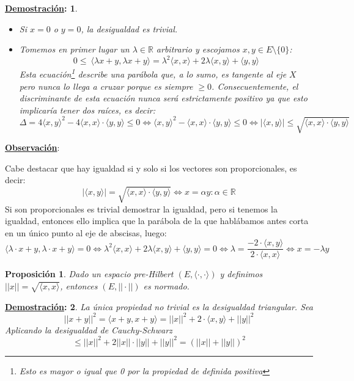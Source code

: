 \documentclass[10pt,a4paper,openright]{book}
\theoremstyle{break}
\newtheorem*{prop}{Proposición}
\newtheorem*{demo}{\underline{Demostración}:}
\begin{document}
\begin{demo}
\begin{itemize}
\item Si $x = 0$ o $y=0$, la desigualdad es trivial.

\item Tomemos en primer lugar un $\lambda\in \mathbb R$ arbitrario y escojamos $x,y \in E \setminus \{0\}$:
$$0 \leq \ \langle \lambda x + y, \lambda x + y\rangle = \lambda^2 \langle x,x\rangle + 2\lambda \langle x,y\rangle + \langle y,y\rangle$$
Esta ecuación\footnote{Esto es mayor o igual que 0 por la propiedad de definida positiva} describe una parábola que, a lo sumo, es tangente al eje $X$ pero nunca lo llega a cruzar porque es siempre $\geq 0$. Consecuentemente, el discriminante de esta ecuación nunca será estrictamente positivo ya que esto implicaría tener dos raíces, es decir:
$$\Delta = 4 \langle x,y\rangle^2 - 4\langle x,x\rangle\cdot \langle y,y\rangle \leq 0 \Leftrightarrow \langle x,y\rangle^2 -\langle x,x\rangle\cdot \langle y,y\rangle \leq 0 \Leftrightarrow|\langle x,y\rangle| \leq \sqrt{\langle x,x\rangle\cdot\langle y,y\rangle}$$
\end{itemize}
\end{demo}

\underline{\textbf{Observación}}:

Cabe destacar que hay igualdad si y solo si los vectores son proporcionales, es decir:
$$|\langle x,y\rangle| =\sqrt{\langle x,x\rangle \cdot \langle y,y\rangle} \Leftrightarrow x = \alpha y : \alpha \in \mathbb{R}$$
Si son proporcionales es trivial demostrar la igualdad, pero si tenemos la igualdad, entonces ello implica que la parábola de la que hablábamos antes corta en un único punto al eje de abscisas, luego:
$$\langle\lambda \cdot x + y, \lambda \cdot x + y\rangle =  0\Leftrightarrow  \lambda^2 \langle x,x\rangle + 2\lambda \langle x,y\rangle + \langle y,y\rangle = 0 \Leftrightarrow \lambda = \frac{-2 \cdot \langle x,y\rangle}{2 \cdot \langle x,x\rangle} \Leftrightarrow x = -\lambda y$$

\begin{prop}
Dado un espacio pre-Hilbert $(E, \langle \cdot, \cdot \rangle)$ y definimos $||x|| = \sqrt{\langle x,x \rangle}$, entonces $(E, || \cdot ||)$ es normado.
\end{prop}

\begin{demo}
La única propiedad no trivial es la desigualdad triangular. Sea 
$$|| x+y||^2 = \langle x+y,x+y\rangle = ||x||^2 + 2 \cdot \langle x,y\rangle + ||y||^2$$
Aplicando la desigualdad de Cauchy-Schwarz
$$\leq ||x||^2 + 2 ||x|| \cdot ||y|| + ||y||^2 = (||x|| + ||y||)^2$$
\end{demo}
\end{document}
